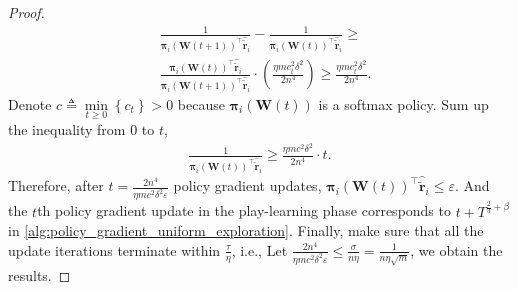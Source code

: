 \documentclass[10pt]{article}
\def\rvtilder{{\tilde{\mathbf{r}}}}
\def\rvpi{{\boldsymbol{\pi}}}
\def\rmW{{\mathbf{W}}}
\begin{document}
\begin{proof}
\begin{equation*}
\begin{split}
    &\frac{1}{\rvpi_i\left( \rmW(t+1) \right)^\top \hat{\rvtilder}_i} - \frac{1}{\rvpi_i\left( \rmW(t) \right)^\top \hat{\rvtilder}_i} \ge \\
    &\frac{\rvpi_i\left( \rmW(t) \right)^\top \hat{\rvtilder}_i}{\rvpi_i\left( \rmW(t+1) \right)^\top \hat{\rvtilder}_i} \cdot \left( \frac{\eta m c_t^2 \delta^2}{2n^4} \right) \ge \frac{\eta m c_t^2 \delta^2}{2n^4}.
\end{split}
\end{equation*}
Denote $c \triangleq \min\limits_{t \ge 0}{\left\{ c_t \right\}} > 0$ because $\rvpi_i\left( \rmW(t) \right)$ is a softmax policy.
Sum up the inequality from $0$ to $t$,
\begin{equation*}
\begin{split}
    \frac{1}{\rvpi_i\left( \rmW(t) \right)^\top \hat{\rvtilder}_i} \ge \frac{\eta m c^2 \delta^2}{2n^4} \cdot t.
\end{split}
\end{equation*}
Therefore, after $t =  \frac{2n^4}{\eta m c^2 \delta^2 \varepsilon}$ policy gradient updates, $\rvpi_i\left( \rmW(t) \right)^\top \hat{\rvtilder}_i \le \varepsilon$. And the $t$th policy gradient update in the play-learning phase corresponds to $t + T^{\frac{2}{3} + \beta}$ in \cref{alg:policy_gradient_uniform_exploration}. Finally, make sure that all the update iterations terminate within $\frac{\tau}{\eta}$, i.e.,
Let $\frac{2n^4}{\eta m c^2 \delta^2 \varepsilon} \le \frac{\sigma}{n \eta} = \frac{1}{n \eta \sqrt{m}}$, we obtain the results.
\end{proof}
\end{document}
